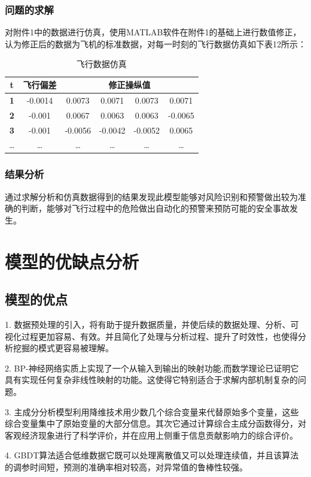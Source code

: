 \documentclass[UTF8]{ctexart}
\begin{document}
\subsubsection{问题的求解}
对附件1中的数据进行仿真，使用MATLAB软件在附件1的基础上进行数值修正，认为修正后的数据为飞机的标准数据，对每一时刻的飞行数据仿真如下表12所示： \par
\begin{table}[!ht]
	\centering
	\caption{飞行数据仿真}
	\begin{tabular}{|c|c|c|c|c|c|}
		\hline
		\textbf{t} & \textbf{飞行偏差}  & \multicolumn{4}{|c|}{\textbf{修正操纵值}} \\ \hline
		\textbf{1} & -0.0014 & 0.0073 & 0.0071 & 0.0073 & 0.0071 \\ \hline
		\textbf{2} & -0.001 & 0.0067 & 0.0063 & 0.0063 & -0.0065 \\ \hline
		\textbf{3} & -0.001 & -0.0056 & -0.0042 & -0.0052 & 0.0065 \\ \hline
		… & … & … & … & … & … \\ \hline
	\end{tabular}
\end{table}
\subsubsection{结果分析}
通过求解分析和仿真数据得到的结果发现此模型能够对风险识别和预警做出较为准确的判断，能够对飞行过程中的危险做出自动化的预警来预防可能的安全事故发生。 \par
\section{模型的优缺点分析}
\subsection{模型的优点}
1.	数据预处理的引入，将有助于提升数据质量，并使后续的数据处理、分析、可视化过程更加容易、有效。并且简化了处理与分析过程、提升了时效性，也使得分析挖掘的模式更容易被理解。 \par 
2.	BP-神经网络实质上实现了一个从输入到输出的映射功能,而数学理论已证明它具有实现任何复杂非线性映射的功能。这使得它特别适合于求解内部机制复杂的问题。 \par 
3.	主成分分析模型利用降维技术用少数几个综合变量来代替原始多个变量，这些综合变量集中了原始变量的大部分信息。其次它通过计算综合主成分函数得分，对客观经济现象进行了科学评价，并在应用上侧重于信息贡献影响力的综合评价。\par 
4.	GBDT算法适合低维数据它既可以处理离散值又可以处理连续值，并且该算法的调参时间短，预测的准确率相对较高，对异常值的鲁棒性较强。 \par 
\end{document}
